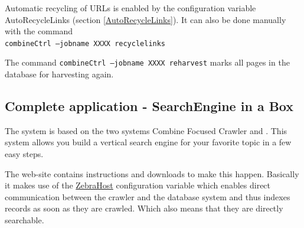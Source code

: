 Automatic recycling of URLs is enabled by the configuration variable
AutoRecycleLinks (section \ref{AutoRecycleLinks}). It can also be done
manually with the command\\
{\tt combineCtrl --jobname XXXX recyclelinks}

The command {\tt combineCtrl --jobname XXXX reharvest} marks all
pages in the database for harvesting again.

\subsection{Complete application - SearchEngine in a Box}

The
 system is based on the two systems Combine Focused Crawler and
 . This system allows you build
 a vertical search engine for your favorite topic in a few easy
 steps.

The  web-site contains instructions and downloads
to make this happen. Basically it makes use of the
\hyperref{ZebraHost}{ZebraHost (see section }{)}{ZebraHost}
configuration variable which enables direct communication between
the crawler and the database system and thus indexes records as soon
as they are crawled. Which also means that they are directly searchable.




